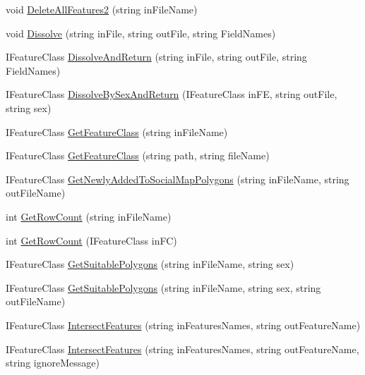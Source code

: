 \begin{DoxyCompactItemize}
\item 
void \hyperlink{class_s_e_a_r_c_h_1_1_data_manipulator_acccef378f87deaa4d7daf38e9810704a}{Delete\-All\-Features2} (string in\-File\-Name)
\item 
void \hyperlink{class_s_e_a_r_c_h_1_1_data_manipulator_ab68ecc2a1bf4bb1bd9f4e70559e82e4b}{Dissolve} (string in\-File, string out\-File, string Field\-Names)
\item 
I\-Feature\-Class \hyperlink{class_s_e_a_r_c_h_1_1_data_manipulator_a5406f2d07d84b70ced89f902a5441626}{Dissolve\-And\-Return} (string in\-File, string out\-File, string Field\-Names)
\item 
I\-Feature\-Class \hyperlink{class_s_e_a_r_c_h_1_1_data_manipulator_a70fda64cc5a27367132f78c6214fffaf}{Dissolve\-By\-Sex\-And\-Return} (I\-Feature\-Class in\-F\-E, string out\-File, string sex)
\item 
I\-Feature\-Class \hyperlink{class_s_e_a_r_c_h_1_1_data_manipulator_a87df299adbf7ac4afc2c39893e89d80b}{Get\-Feature\-Class} (string in\-File\-Name)
\item 
I\-Feature\-Class \hyperlink{class_s_e_a_r_c_h_1_1_data_manipulator_acc4b6dc1bf9c53126329df3e5897d160}{Get\-Feature\-Class} (string path, string file\-Name)
\item 
I\-Feature\-Class \hyperlink{class_s_e_a_r_c_h_1_1_data_manipulator_a10156760991b383df31c40807bebf045}{Get\-Newly\-Added\-To\-Social\-Map\-Polygons} (string in\-File\-Name, string out\-File\-Name)
\item 
int \hyperlink{class_s_e_a_r_c_h_1_1_data_manipulator_ac328b16927b1f874e8fb7a2ffbf82e6a}{Get\-Row\-Count} (string in\-File\-Name)
\item 
int \hyperlink{class_s_e_a_r_c_h_1_1_data_manipulator_afb9797833d39815381d5e1231fe70c94}{Get\-Row\-Count} (I\-Feature\-Class in\-F\-C)
\item 
I\-Feature\-Class \hyperlink{class_s_e_a_r_c_h_1_1_data_manipulator_af1470bc6c7509bb80efff28d618984f1}{Get\-Suitable\-Polygons} (string in\-File\-Name, string sex)
\item 
I\-Feature\-Class \hyperlink{class_s_e_a_r_c_h_1_1_data_manipulator_a5550febcb2a5945eb7cb0d5a52377c4b}{Get\-Suitable\-Polygons} (string in\-File\-Name, string sex, string out\-File\-Name)
\item 
I\-Feature\-Class \hyperlink{class_s_e_a_r_c_h_1_1_data_manipulator_a55736d637b0508e504de339a2071ef67}{Intersect\-Features} (string in\-Features\-Names, string out\-Feature\-Name)
\item 
I\-Feature\-Class \hyperlink{class_s_e_a_r_c_h_1_1_data_manipulator_a9ec0c428301da7b714399d90a62c4015}{Intersect\-Features} (string in\-Features\-Names, string out\-Feature\-Name, string ignore\-Message)

\end{DoxyCompactItemize}
